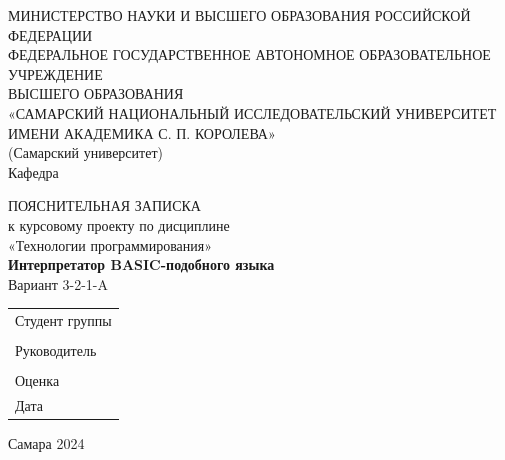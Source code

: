 \documentclass[14pt,a4paper]{article}
\begin{document}
\begin{titlepage}
\begin{center}
МИНИСТЕРСТВО НАУКИ И ВЫСШЕГО ОБРАЗОВАНИЯ РОССИЙСКОЙ ФЕДЕРАЦИИ\\
ФЕДЕРАЛЬНОЕ ГОСУДАРСТВЕННОЕ АВТОНОМНОЕ ОБРАЗОВАТЕЛЬНОЕ УЧРЕЖДЕНИЕ\\
ВЫСШЕГО ОБРАЗОВАНИЯ\\
«САМАРСКИЙ НАЦИОНАЛЬНЫЙ ИССЛЕДОВАТЕЛЬСКИЙ УНИВЕРСИТЕТ\\
ИМЕНИ АКАДЕМИКА С. П. КОРОЛЕВА»\\
(Самарский университет)\\[12pt]
Кафедра \underline{\hspace{6cm}}
\end{center}

\vfill

\begin{center}
ПОЯСНИТЕЛЬНАЯ ЗАПИСКА\\
к курсовому проекту по дисциплине\\
«Технологии программирования»\\[12pt]
\textbf{Интерпретатор BASIC-подобного языка}\\
Вариант 3-2-1-A
\end{center}

\vfill

\begin{flushright}
\begin{tabular}{l}
Студент группы \underline{\hspace{2.5cm}} \\
\underline{\hspace{5cm}} \\
Руководитель \underline{\hspace{2.5cm}} \\
\underline{\hspace{5cm}} \\
Оценка \underline{\hspace{3cm}} \\
Дата \underline{\hspace{3cm}}
\end{tabular}
\end{flushright}

\vfill

\begin{center}
Самара 2024
\end{center}
\end{titlepage}
\end{document}
